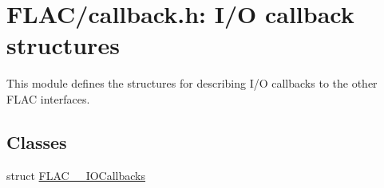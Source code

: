 \hypertarget{group__flac__callbacks}{}\section{F\+L\+A\+C/callback.h\+: I/O callback structures}
\label{group__flac__callbacks}


This module defines the structures for describing I/O callbacks to the other F\+L\+AC interfaces.  


\subsection*{Classes}
\begin{DoxyCompactItemize}
\item 
struct \mbox{\hyperlink{struct_f_l_a_c_____i_o_callbacks}{F\+L\+A\+C\+\_\+\+\_\+\+I\+O\+Callbacks}}
\end{DoxyCompactItemize}
